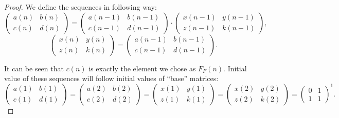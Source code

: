 \documentclass[en]{pracamgr}
\theoremstyle{definition}
\begin{document}
\begin{proof}
    We define the sequences in following way:
    $$
    \begin{pmatrix}
        a(n) & b(n)\\ 
        c(n) & d(n)
    \end{pmatrix} =
    \begin{pmatrix}
        a(n-1) & b(n-1)\\ 
        c(n-1) & d(n-1)
    \end{pmatrix}
    \cdot
    \begin{pmatrix}
        x(n-1) & y(n-1)\\ 
        z(n-1) & k(n-1)
    \end{pmatrix},
    $$
    $$
    \begin{pmatrix}
        x(n) & y(n)\\ 
        z(n) & k(n)
    \end{pmatrix} =
    \begin{pmatrix}
        a(n-1) & b(n-1)\\ 
        c(n-1) & d(n-1)
    \end{pmatrix}.
    $$

    It can be seen that $c(n)$ is exactly the element we chose as $F_F(n)$.
    Initial value of these sequences will follow initial values of ``base'' matrices:
    $$
    \begin{pmatrix}
        a(1) & b(1)\\ 
        c(1) & d(1)
    \end{pmatrix} =
    \begin{pmatrix}
        a(2) & b(2)\\ 
        c(2) & d(2)
    \end{pmatrix} =
    \begin{pmatrix}
        x(1) & y(1)\\ 
        z(1) & k(1)
    \end{pmatrix} =
    \begin{pmatrix}
        x(2) & y(2)\\ 
        z(2) & k(2)
    \end{pmatrix} =
    \begin{pmatrix}
        0 & 1\\ 
        1 & 1
    \end{pmatrix}^1.
    $$


\end{proof}
\end{document}
